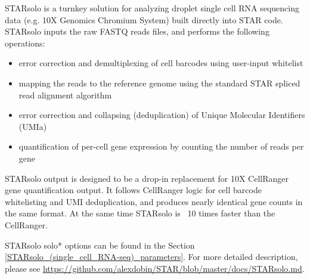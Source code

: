 \documentclass[12pt]{article}
\begin{document}
STARsolo is a turnkey solution for analyzing droplet single cell RNA sequencing data (e.g. 10X Genomics Chromium System) built directly into STAR code.
STARsolo inputs the raw FASTQ reads files, and performs the following operations:
\begin{itemize}
	\itemsep -0.5em
	\item
	error correction and demultiplexing of cell barcodes using user-input whitelist
	\item
	mapping the reads to the reference genome using the standard STAR spliced read alignment algorithm
	\item
	error correction and collapsing (deduplication) of Unique Molecular Identifiers (UMIa)
	\item
	quantification of per-cell gene expression by counting the number of reads per gene
\end{itemize}
STARsolo output is designed to be a drop-in replacement for 10X CellRanger gene quantification output.
It follows CellRanger logic for cell barcode whitelisting and UMI deduplication, and produces nearly identical gene counts in the same format. At the same time STARsolo is ~10 times faster than the CellRanger.

STARsolo solo* options can be found in the Section \ref{STARsolo_(single_cell_RNA-seq)_parameters}.
For more detailed description, please see \url{https://github.com/alexdobin/STAR/blob/master/docs/STARsolo.md}.
\end{document}
